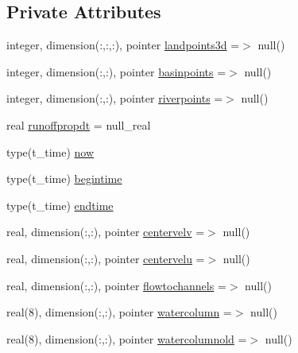 \subsection*{Private Attributes}
\begin{DoxyCompactItemize}
\item 
integer, dimension(\+:,\+:,\+:), pointer \mbox{\hyperlink{structmodulerunoffproperties_1_1t__extvar_a75e8c3cb5ff74e3ba771d84dddad5afa}{landpoints3d}} =$>$ null()
\item 
integer, dimension(\+:,\+:), pointer \mbox{\hyperlink{structmodulerunoffproperties_1_1t__extvar_a985f517ca2c8523d2a02d3fed928ef48}{basinpoints}} =$>$ null()
\item 
integer, dimension(\+:,\+:), pointer \mbox{\hyperlink{structmodulerunoffproperties_1_1t__extvar_a49223befb1664e85e58bc377373c2c01}{riverpoints}} =$>$ null()
\item 
real \mbox{\hyperlink{structmodulerunoffproperties_1_1t__extvar_a96ab1078a7b055e0ba43abe52f385b40}{runoffpropdt}} = null\+\_\+real
\item 
type(t\+\_\+time) \mbox{\hyperlink{structmodulerunoffproperties_1_1t__extvar_aaf4577a50a54b71dfadcdb833b0ef2f0}{now}}
\item 
type(t\+\_\+time) \mbox{\hyperlink{structmodulerunoffproperties_1_1t__extvar_a2c99ce101949bb988ef76b06734ca801}{begintime}}
\item 
type(t\+\_\+time) \mbox{\hyperlink{structmodulerunoffproperties_1_1t__extvar_abefa45bc86312968167af9d6278ce67d}{endtime}}
\item 
real, dimension(\+:,\+:), pointer \mbox{\hyperlink{structmodulerunoffproperties_1_1t__extvar_a1bd694a665918b056588bf472b7d2442}{centervelv}} =$>$ null()
\item 
real, dimension(\+:,\+:), pointer \mbox{\hyperlink{structmodulerunoffproperties_1_1t__extvar_ae6d1de93bf40f13bac4381159be8d219}{centervelu}} =$>$ null()
\item 
real, dimension(\+:,\+:), pointer \mbox{\hyperlink{structmodulerunoffproperties_1_1t__extvar_ac267fb3632c5624a99baccf8d06191bd}{flowtochannels}} =$>$ null()
\item 
real(8), dimension(\+:,\+:), pointer \mbox{\hyperlink{structmodulerunoffproperties_1_1t__extvar_a7fcad18f3523d17deaf82fdb0414eda0}{watercolumn}} =$>$ null()
\item 
real(8), dimension(\+:,\+:), pointer \mbox{\hyperlink{structmodulerunoffproperties_1_1t__extvar_a7e3b80c799e1487f27c21fdf52692054}{watercolumnold}} =$>$ null()
\item 

\end{DoxyCompactItemize}
